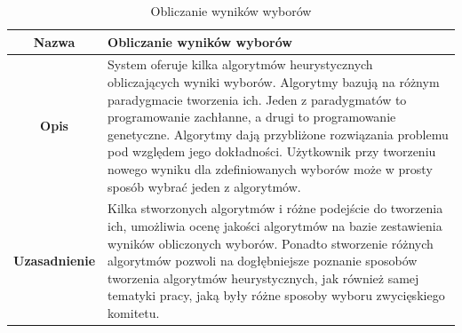 \documentclass[polish,11pt]{aghthesis}
\begin{document}
\begin{table}
\centering
\begin{tabular}{|c|p{10cm}|}
\hline
\textbf{Nazwa} & Obliczanie wyników wyborów \\ 
\hline 
\textbf{Opis} & System oferuje kilka algorytmów heurystycznych obliczających wyniki
wyborów. Algorytmy bazują na różnym paradygmacie tworzenia ich.
Jeden z paradygmatów to programowanie zachłanne, a drugi to
programowanie genetyczne. Algorytmy dają przybliżone rozwiązania
problemu pod względem jego dokładności. Użytkownik przy tworzeniu
nowego wyniku dla zdefiniowanych wyborów może w prosty sposób
wybrać jeden z algorytmów. \\ 
\hline 
\textbf{Uzasadnienie} & Kilka stworzonych algorytmów i różne podejście do tworzenia ich,
umożliwia ocenę jakości algorytmów na bazie zestawienia wyników
obliczonych wyborów. Ponadto stworzenie różnych algorytmów pozwoli
na dogłębniejsze poznanie sposobów tworzenia algorytmów
heurystycznych, jak również samej tematyki pracy, jaką były różne
sposoby wyboru zwycięskiego komitetu.\\ 
\hline 
\end{tabular}
\caption{Obliczanie wyników wyborów} 
\end{table}
\clearpage
\end{document}
